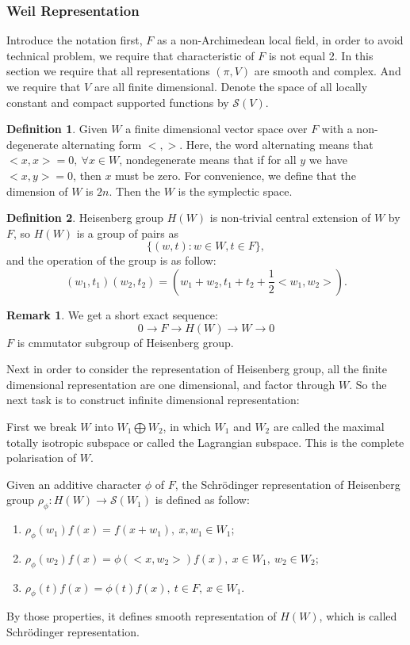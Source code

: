 \documentclass[12pt,a4paper,english]{article}
\theoremstyle{plain}
\theoremstyle{definition}
\newtheorem{defi}{Definition}
\newtheorem*{rem}{Remark}
\begin{document}
\subsubsection{Weil Representation}
Introduce the notation first, $F$ as a non-Archimedean local field, in order to avoid technical problem, we require that characteristic of $F$ is not equal 2. In this section we require that all representations $(\pi, V)$ are smooth and complex. And we require that $V$ are all finite dimensional. Denote the space of all locally constant and compact supported functions by $\mathcal{S}(V)$.

\begin{defi}
Given $W$ a finite dimensional vector space over $F$ with a non-degenerate alternating form $<, >$. Here, the word alternating means that $<x,x>=0,\ \forall x\in W$, nondegenerate means that if for all $y$ we have $<x, y>=0$, then $x$ must be zero. For convenience, we define that the dimension of $W$ is $2n$. Then the $W$ is the symplectic space.
\end{defi}
\begin{defi}
Heisenberg group $H(W)$ is non-trivial central extension of $W$ by $F$, so $H(W)$ is a group of pairs as
\begin{equation*}
    \big\{ (w,t): w\in W, t\in F \big\},
\end{equation*}
and the operation of the group is as follow:
\begin{equation*}
    (w_{1},t_{1})(w_{2},t_{2})=(w_{1}+w_{2},t_{1}+t_{2}+\frac{1}{2}<w_{1},w_{2}>).
\end{equation*}
\end{defi}
\begin{rem}
We get a short exact sequence:
\begin{equation*}
   0\rightarrow F\rightarrow H(W)\rightarrow W\rightarrow 0 
\end{equation*}
$F$ is cmmutator subgroup of Heisenberg group.
\end{rem} 

Next in order to consider the representation of Heisenberg group, all the finite dimensional representation are one dimensional, and factor through $W$. So the next task is to construct infinite dimensional representation:

First we break $W$ into $W_{1}\bigoplus W_{2}$, in which $W_{1}$ and $W_{2}$ are called the maximal totally isotropic subspace or called the Lagrangian subspace. This is the complete polarisation of $W$.

Given an additive character $\phi$ of $F$, the Schr\"odinger representation of Heisenberg group $\rho_{\phi}: H(W)\rightarrow \mathcal{S}(W_{1})$ is defined as follow: 
\begin{enumerate}
    \item $\rho_{\phi}(w_{1})f(x)=f(x+w_{1}),\ x,w_{1}\in W_{1}$;
    \item $\rho_{\phi}(w_{2})f(x)=\phi(<x,w_{2}>)f(x),\ x\in W_{1},\ w_{2}\in W_{2}$;
    \item $\rho_{\phi}(t)f(x)=\phi(t)f(x),\ t\in F,\ x\in W_{1}$.
\end{enumerate}
By those properties, it defines smooth representation of $H(W)$, which is called Schr\"odinger representation.
\end{document}
